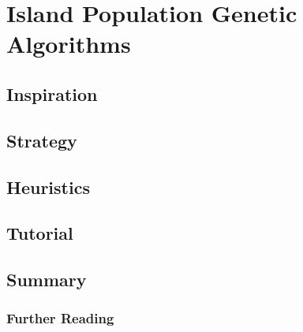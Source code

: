 \section{Island Population Genetic Algorithms}

\subsection{Inspiration}


\subsection{Strategy}


\subsection{Heuristics}


\subsection{Tutorial}


\subsection{Summary}


\subsubsection{Further Reading}